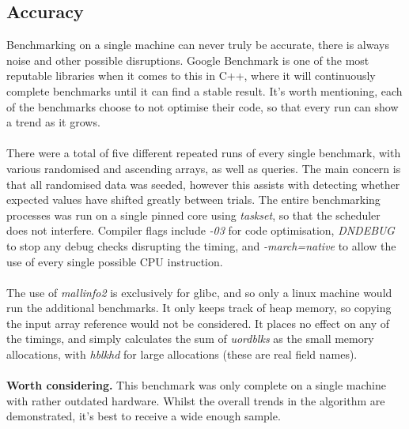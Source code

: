 \documentclass{article}
\theoremstyle{definition}
\begin{document}
\subsection{Accuracy}
Benchmarking on a single machine can never truly be accurate, there is always noise and other possible disruptions.  Google Benchmark is one of the most reputable libraries when it comes to this in C++, where it will continuously complete benchmarks until it can find a stable result.  It's worth mentioning, each of the benchmarks choose to not optimise their code, so that every run can show a trend as it grows.
\\
\\
There were a total of five different repeated runs of every single benchmark, with various randomised and ascending arrays, as well as queries.  The main concern is that all randomised data was seeded, however this assists with detecting whether expected values have shifted greatly between trials.  The entire benchmarking processes was run on a single pinned core using \textit{taskset}, so that the scheduler does not interfere.  Compiler flags include \textit{-03} for code optimisation, \textit{DNDEBUG} to stop any debug checks disrupting the timing, and \textit{-march=native} to allow the use of every single possible CPU instruction.
\\
\\
The use of \textit{mallinfo2} is exclusively for glibc, and so only a linux machine would run the additional benchmarks.  It only keeps track of heap memory, so copying the input array reference would not be considered.  It places no effect on any of the timings, and simply calculates the sum of \textit{uordblks} as the small memory allocations, with \textit{hblkhd} for large allocations (these are real field names).
\\
\\
\textbf{Worth considering.}  This benchmark was only complete on a single machine with rather outdated hardware.  Whilst the overall trends in the algorithm are demonstrated, it's best to receive a wide enough sample.
\end{document}
